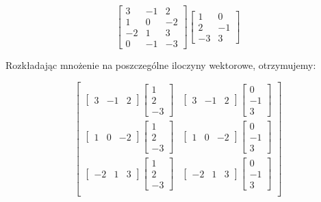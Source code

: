 \documentclass{article}
\begin{document}
\[
\begin{bmatrix} 
3 & -1 & 2 \\ 
1 & 0 & -2 \\ 
-2 & 1 & 3 \\ 
0 & -1 & -3 
\end{bmatrix} 
\begin{bmatrix} 
1 & 0 \\ 
2 & -1 \\ 
-3 & 3 
\end{bmatrix}
\]

Rozkładając mnożenie na poszczególne iloczyny wektorowe, otrzymujemy:

\[
\begin{bmatrix} 
\begin{bmatrix} 3 & -1 & 2 \end{bmatrix} \begin{bmatrix} 1 \\ 2 \\ -3 \end{bmatrix} & 
\begin{bmatrix} 3 & -1 & 2 \end{bmatrix} \begin{bmatrix} 0 \\ -1 \\ 3 \end{bmatrix} \\[10pt]

\begin{bmatrix} 1 & 0 & -2 \end{bmatrix} \begin{bmatrix} 1 \\ 2 \\ -3 \end{bmatrix} & 
\begin{bmatrix} 1 & 0 & -2 \end{bmatrix} \begin{bmatrix} 0 \\ -1 \\ 3 \end{bmatrix} \\[10pt]

\begin{bmatrix} -2 & 1 & 3 \end{bmatrix} \begin{bmatrix} 1 \\ 2 \\ -3 \end{bmatrix} & 
\begin{bmatrix} -2 & 1 & 3 \end{bmatrix} \begin{bmatrix} 0 \\ -1 \\ 3 \end{bmatrix} \\[10pt]


\end{bmatrix}\]
\end{document}
